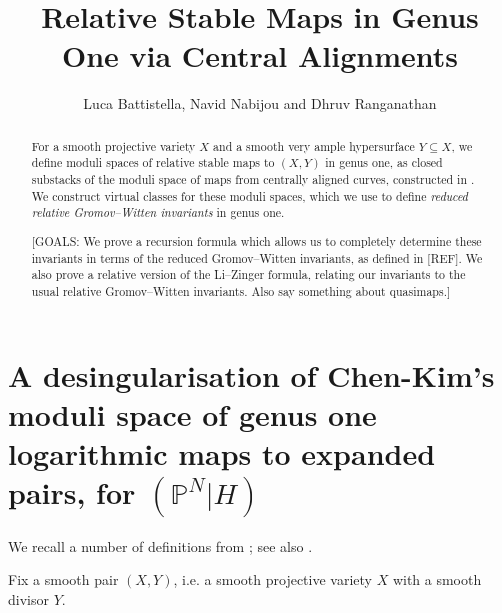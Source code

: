 \documentclass[11pt]{amsart}
\title[Genus One Reduced Relative Invariants]{Relative Stable Maps in Genus One via Central Alignments}
\author{Luca Battistella, Navid Nabijou and Dhruv Ranganathan}
\date{\thismonthyear}
\newcommand{\PP}{\mathbb P}
\theoremstyle{definition}
\theoremstyle{definition}
\begin{document}
\begin{abstract} For a smooth projective variety $X$ and a smooth very ample hypersurface $Y \subseteq X$, we define moduli spaces of relative stable maps to $(X,Y)$ in genus one, as closed substacks of the moduli space of maps from centrally aligned curves, constructed in \cite{RSPW}. We construct virtual classes for these moduli spaces, which we use to define \emph{reduced relative Gromov--Witten invariants} in genus one.

[GOALS: We prove a recursion formula which allows us to completely determine these invariants in terms of the reduced Gromov--Witten invariants, as defined in [REF]. We also prove a relative version of the Li--Zinger formula, relating our invariants to the usual relative Gromov--Witten invariants. Also say something about quasimaps.]
\end{abstract}

\maketitle

\appendixtitletocoff
\tableofcontents

\section{A desingularisation of Chen-Kim's moduli space of genus one logarithmic maps to expanded pairs, for $(\PP^N|H)$}

We recall a number of definitions from \cite{ChenDegeneration}; see also \cite{KimLog}.

Fix a smooth pair $(X,Y)$, i.e. a smooth projective variety $X$ with a smooth divisor $Y$.
\end{document}
